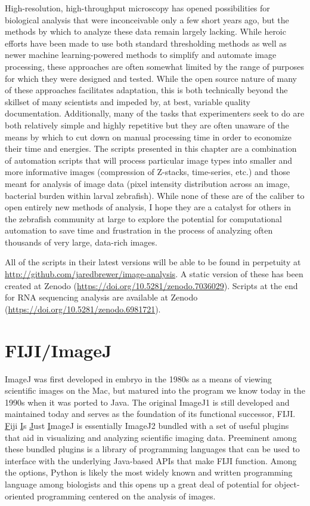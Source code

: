 High\hyp{}resolution, high\hyp{}throughput microscopy has opened possibilities for biological analysis that were inconceivable only a few short years ago, but the methods by which to analyze these data remain largely lacking. While heroic efforts have been made to use both standard thresholding methods as well as newer machine learning\hyp{}powered methods to simplify and automate image processing, these approaches are often somewhat limited by the range of purposes for which they were designed and tested. While the open source nature of many of these approaches facilitates adaptation, this is both technically beyond the skillset of many scientists and impeded by, at best, variable quality documentation. Additionally, many of the tasks that experimenters seek to do are both relatively simple and highly repetitive but they are often unaware of the means by which to cut down on manual processing time in order to economize their time and energies. The scripts presented in this chapter are a combination of automation scripts that will process particular image types into smaller and more informative images (compression of Z\hyp{}stacks, time\hyp{}series, etc.) and those meant for analysis of image data (pixel intensity distribution across an image, bacterial burden within larval zebrafish). While none of these are of the caliber to open entirely new methods of analysis, I hope they are a catalyst for others in the zebrafish community at large to explore the potential for computational automation to save time and frustration in the process of analyzing often thousands of very large, data\hyp{}rich images.

All of the scripts in their latest versions will be able to be found in perpetuity at \url{http://github.com/jaredbrewer/image-analysis}. A static version of these has been created at Zenodo (\url{https://doi.org/10.5281/zenodo.7036029}). Scripts at the end for RNA sequencing analysis are available at Zenodo (\url{https://doi.org/10.5281/zenodo.6981721}). 

\section{FIJI/ImageJ}\label{fiji}

ImageJ was first developed in embryo in the 1980s as a means of viewing scientific images on the Mac, but matured into the program we know today in the 1990s when it was ported to Java. The original ImageJ1 is still developed and maintained today and serves as the foundation of its functional successor, FIJI. \underline{F}iji \underline{I}s \underline{J}ust \underline{I}mageJ is essentially ImageJ2 bundled with a set of useful plugins that aid in visualizing and analyzing scientific imaging data. Preeminent among these bundled plugins is a library of programming languages that can be used to interface with the underlying Java\hyp{}based APIs that make FIJI function. Among the options, Python is likely the most widely known and written programming language among biologists and this opens up a great deal of potential for object\hyp{}oriented programming centered on the analysis of images. 

